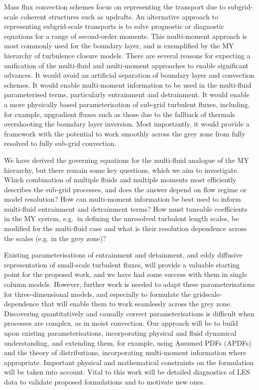 \documentclass[11pt,a4paper]{article}
\begin{document}
Mass flux convection schemes focus on representing the transport due to subgrid-scale coherent structures such as
updrafts. An alternative approach to representing subgrid-scale transports is to solve prognostic or diagnostic
equations for a range of second-order moments. This multi-moment approach is most commonly used for the
boundary layer, and is exemplified by the \citet{mellor1973,mellor1974,mellor1982} MY hierarchy of turbulence
closure models.
There are several reasons for expecting a unification of the multi-fluid and multi-moment approaches to enable
significant advances. It would avoid an artificial separation of boundary layer and convection schemes.
It would enable multi-moment information to be used in the multi-fluid parameterised terms, particularly
entrainment and detrainment. It would enable a more physically based parameterisation of sub-grid turbulent
fluxes, including, for example, upgradient fluxes such as those due to the fallback of thermals
overshooting the boundary layer inversion. Most importantly, it would provide a framework
with the potential to work smoothly across the grey zone from fully resolved to fully sub-grid convection.

We have derived the governing equations for the multi-fluid analogue of the MY hierarchy, but there remain
some key questions, which we aim to investigate. Which combination of multiple fluids and multiple moments
most efficiently describes the sub-grid processes, and does the answer depend on flow regime or model resolution?
How can multi-moment information be best used to inform multi-fluid entrainment and detrainment terms?
How must tuneable coefficients in the MY system, e.g.\ in defining {\color{blue} the unresolved} turbulent length scales, be modified
for the multi-fluid case {\color{blue} and what is their resolution dependence across the scales (e.g. in the grey zone)? } 

Existing parameterisations of entrainment and detainment, and eddy diffusive representation of small-scale turbulent
fluxes, will provide a valuable starting point for the proposed work, and we have had some success with them in
single column models. However, further work is needed to adapt these parameterisations for three-dimensional models,
and especially to formulate the gridscale-dependence that will enable them to work seamlessly across the grey zone.
Discovering quantitatively and causally correct parameterisations is difficult when processes are complex, as in moist
convection. Our approach will be to build upon existing parameterisations, incorporating physical and fluid dynamical
understanding, and extending them, for example, using Assumed PDFs (APDFs) and the theory of distributions, incorporating
multi-moment information where appropriate. Important physical and mathematical constraints on the formulation will
be taken into account. Vital to this work will be detailed diagnostics of LES data to validate proposed formulations
and to motivate new ones.
\end{document}
